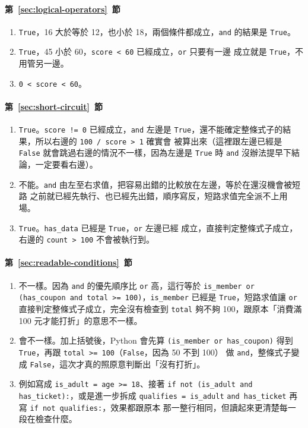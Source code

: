 \paragraph{第~\ref{sec:logical-operators}~節}
\begin{enumerate}
\item \texttt{True}，16 大於等於 12，也小於 18，兩個條件都成立，\texttt{and} 的結果是
\texttt{True}。
\item \texttt{True}，45 小於 60，\texttt{score < 60} 已經成立，\texttt{or} 只要有一邊
成立就是 \texttt{True}，不用管另一邊。
\item \texttt{0 < score < 60}。
\end{enumerate}

\paragraph{第~\ref{sec:short-circuit}~節}
\begin{enumerate}
\item \texttt{True}。\texttt{score != 0} 已經成立，\texttt{and} 左邊是
\texttt{True}，還不能確定整條式子的結果，所以右邊的 \texttt{100 / score > 1} 確實會
被算出來（這裡跟左邊已經是 \texttt{False} 就會跳過右邊的情況不一樣，因為左邊是
\texttt{True} 時 \texttt{and} 沒辦法提早下結論，一定要看右邊）。
\item 不能。\texttt{and} 由左至右求值，把容易出錯的比較放在左邊，等於在還沒機會被短路
之前就已經先執行、也已經先出錯，順序寫反，短路求值完全派不上用場。
\item \texttt{True}。\texttt{has\_data} 已經是 \texttt{True}，\texttt{or} 左邊已經
成立，直接判定整條式子成立，右邊的 \texttt{count > 100} 不會被執行到。
\end{enumerate}

\paragraph{第~\ref{sec:readable-conditions}~節}
\begin{enumerate}
\item 不一樣。因為 \texttt{and} 的優先順序比 \texttt{or} 高，這行等於
\texttt{is\_member or (has\_coupon and total >= 100)}，\texttt{is\_member} 已經是
\texttt{True}，短路求值讓 \texttt{or} 直接判定整條式子成立，完全沒有檢查到
\texttt{total} 夠不夠 100，跟原本「消費滿 100 元才能打折」的意思不一樣。
\item 會不一樣。加上括號後，Python 會先算 \texttt{(is\_member or has\_coupon)}
得到 \texttt{True}，再跟 \texttt{total >= 100}（\texttt{False}，因為 50 不到 100）
做 \texttt{and}，整條式子變成 \texttt{False}，這次才真的照原意判斷出「沒有打折」。
\item 例如寫成 \texttt{is\_adult = age >= 18}、接著
\texttt{if not (is\_adult and has\_ticket):}，或是進一步拆成 \texttt{qualifies =
is\_adult} \texttt{and has\_ticket} 再寫 \texttt{if not qualifies:}，效果都跟原本
那一整行相同，但讀起來更清楚每一段在檢查什麼。
\end{enumerate}

